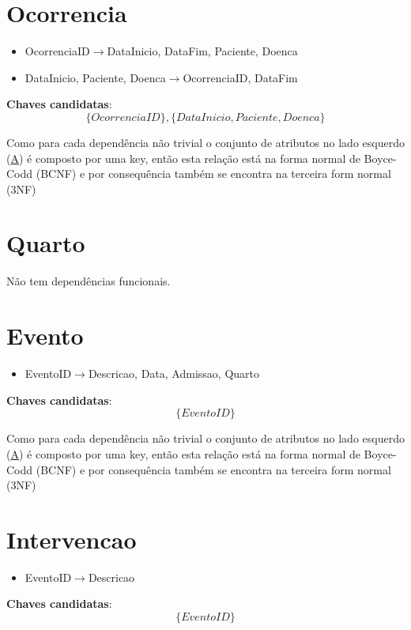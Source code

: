 \documentclass[article, a4paper, 12pt, oneside]{memoir}
\begin{document}
\section*{Ocorrencia}
\begin{itemize}
	\item OcorrenciaID$\rightarrow$DataInicio, DataFim, Paciente, Doenca
	\item DataInicio, Paciente, Doenca$\rightarrow$OcorrenciaID, DataFim
\end{itemize}

\textbf{Chaves candidatas}:\\
\[
\{ OcorrenciaID \}, \{ DataInicio, Paciente, Doenca \}
\]

Como para cada dependência não trivial o conjunto de atributos no lado esquerdo (\underline{A}) é composto por uma key, então esta relação está na forma normal de Boyce-Codd (BCNF) e por consequência também se encontra na terceira form normal (3NF)

\section*{Quarto}
Não tem dependências funcionais.

\section*{Evento}
\begin{itemize}
	\item EventoID$\rightarrow$Descricao, Data, Admissao, Quarto
\end{itemize}

\textbf{Chaves candidatas}:\\
\[
\{ EventoID \}
\]

Como para cada dependência não trivial o conjunto de atributos no lado esquerdo (\underline{A}) é composto por uma key, então esta relação está na forma normal de Boyce-Codd (BCNF) e por consequência também se encontra na terceira form normal (3NF)

\newpage

\section*{Intervencao}
\begin{itemize}
	\item EventoID$\rightarrow$Descricao
\end{itemize}

\textbf{Chaves candidatas}:\\
\[
\{ EventoID \}
\]
\end{document}

